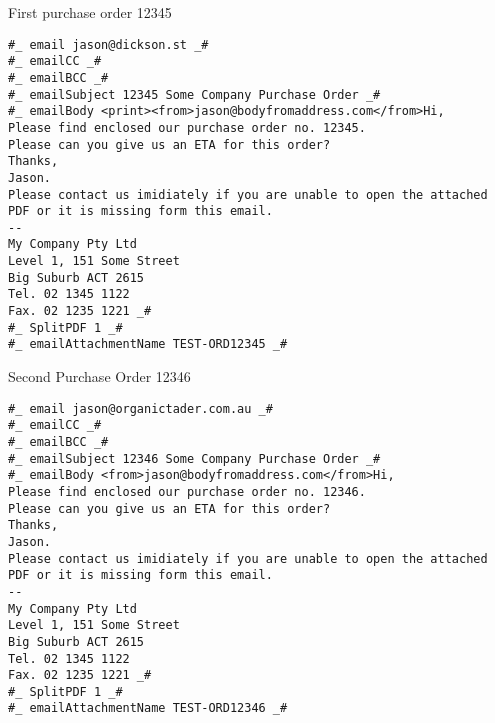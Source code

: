 \documentclass{article}
\begin{document}
\thispagestyle{empty}
First purchase order 12345
\newpage
\thispagestyle{empty}
\begin{verbatim}
#_ email jason@dickson.st _#
#_ emailCC _#
#_ emailBCC _#
#_ emailSubject 12345 Some Company Purchase Order _#
#_ emailBody <print><from>jason@bodyfromaddress.com</from>Hi,
Please find enclosed our purchase order no. 12345.
Please can you give us an ETA for this order?
Thanks,
Jason.
Please contact us imidiately if you are unable to open the attached
PDF or it is missing form this email.
--
My Company Pty Ltd
Level 1, 151 Some Street
Big Suburb ACT 2615
Tel. 02 1345 1122
Fax. 02 1235 1221 _#
#_ SplitPDF 1 _#
#_ emailAttachmentName TEST-ORD12345 _#
\end{verbatim}
\newpage
\thispagestyle{empty}
Second Purchase Order 12346
\newpage
\thispagestyle{empty}
\begin{verbatim}
#_ email jason@organictader.com.au _#
#_ emailCC _#
#_ emailBCC _#
#_ emailSubject 12346 Some Company Purchase Order _#
#_ emailBody <from>jason@bodyfromaddress.com</from>Hi,
Please find enclosed our purchase order no. 12346.
Please can you give us an ETA for this order?
Thanks,
Jason.
Please contact us imidiately if you are unable to open the attached
PDF or it is missing form this email.
--
My Company Pty Ltd
Level 1, 151 Some Street
Big Suburb ACT 2615
Tel. 02 1345 1122
Fax. 02 1235 1221 _#
#_ SplitPDF 1 _#
#_ emailAttachmentName TEST-ORD12346 _#
\end{verbatim}
\newpage
\end{document}
